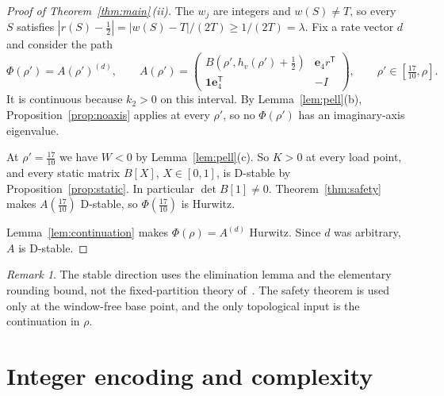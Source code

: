\documentclass[11pt,a4paper]{article}
\theoremstyle{plain}
\theoremstyle{definition}
\theoremstyle{remark}
\newtheorem{remark}[theorem]{Remark}
\newcommand{\one}{\mathbf{1}}
\newcommand{\scl}[2]{#1^{(#2)}}
\newcommand{\be}{\mathbf{e}}
\begin{document}
\begin{proof}[Proof of Theorem~\ref{thm:main}\,(ii)]
The $w_j$ are integers and $w(S)\ne T$, so every $S$ satisfies
$|r(S)-\tfrac12|=|w(S)-T|/(2T)\ge1/(2T)=\lambda$. Fix a rate vector $d$ and consider the path
\[
\Phi(\rho')=\scl{A(\rho')}d,\qquad A(\rho')=\begin{pmatrix}B(\rho',h_v(\rho')+\tfrac12)&\be_4r^{\mathsf T}\\ \one \be_4^{\mathsf T}&-I\end{pmatrix},\qquad
\rho'\in[\tfrac{17}{10},\rho].
\]
It is continuous because $k_2>0$ on this interval. By Lemma~\ref{lem:pell}(b),
Proposition~\ref{prop:noaxis} applies at every $\rho'$, so no $\Phi(\rho')$ has an
imaginary-axis eigenvalue.

At $\rho'=\tfrac{17}{10}$ we have $W<0$ by Lemma~\ref{lem:pell}(c). So $K>0$ at every
load point, and every static matrix $B[X]$, $X\in[0,1]$, is D-stable by
Proposition~\ref{prop:static}. In particular $\det B[1]\ne0$. Theorem~\ref{thm:safety}
makes $A(\tfrac{17}{10})$ D-stable, so $\Phi(\tfrac{17}{10})$ is Hurwitz.

Lemma~\ref{lem:continuation} makes $\Phi(\rho)=\scl Ad$ Hurwitz. Since $d$ was arbitrary,
$A$ is D-stable.
\end{proof}

\begin{remark}
The stable direction uses the elimination lemma and the elementary rounding bound, not
the fixed-partition theory of~\cite{companion2026}. The safety theorem is used only at
the window-free base point, and the only topological input is the continuation in
$\rho$.
\end{remark}

\section{Integer encoding and complexity}\label{sec:encoding}
\end{document}
